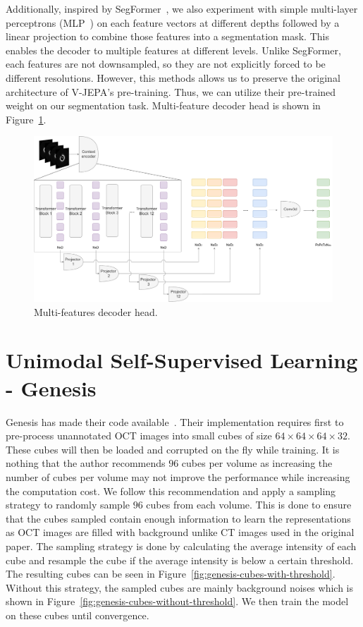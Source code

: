 \documentclass[a4paper,11pt,oneside]{report}
\begin{document}
Additionally, inspired by SegFormer~\cite{Xie2021SegFormer}, we also experiment with simple multi-layer perceptrons (MLP~\cite{Rumelhart1986}) on each feature vectors at different depths followed by a linear projection to combine those features into a segmentation mask. This enables the decoder to multiple features at different levels. Unlike SegFormer, each features are not downsampled, so they are not explicitly forced to be different resolutions. However, this methods allows us to preserve the original architecture of V-JEPA's pre-training. Thus, we can utilize their pre-trained weight on our segmentation task. Multi-feature decoder head is shown in Figure~\ref{fig:vjepa-multi-feature-decoder-head}.

\begin{figure}[ht]
    \centering
    \includegraphics[width=1.0\linewidth]{figures/fig_implementation_vjepa_multifeat.pdf}
    \caption{Multi-features decoder head.}
    \label{fig:vjepa-multi-feature-decoder-head}
\end{figure}

\section{Unimodal Self-Supervised Learning - Genesis}
Genesis has made their code available~\cite{Zhou2021}. Their implementation requires first to pre-process unannotated OCT images into small cubes of size $64\times 64\times 64\times 32$. These cubes will then be loaded and corrupted on the fly while training. It is nothing that the author recommends $96$ cubes per volume as increasing the number of cubes per volume may not improve the performance while increasing the computation cost. We follow this recommendation and apply a sampling strategy to randomly sample $96$ cubes from each volume. This is done to ensure that the cubes sampled contain enough information to learn the representations as OCT images are filled with background unlike CT images used in the original paper. The sampling strategy is done by calculating the average intensity of each cube and resample the cube if the average intensity is below a certain threshold. The resulting cubes can be seen in Figure~\ref{fig:genesis-cubes-with-threshold}. Without this strategy, the sampled cubes are mainly background noises which is shown in Figure~\ref{fig:genesis-cubes-without-threshold}. We then train the model on these cubes until convergence.
\end{document}
